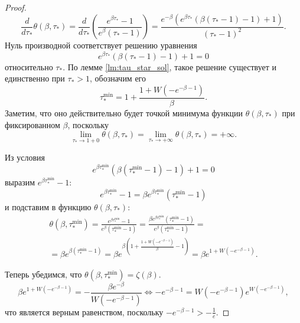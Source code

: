 \begin{proof}
	\begin{equation*}
		\frac{d}{d\tau_*} \theta(\beta, \tau_*) = \frac{d}{d\tau_*} \left( \frac{e^{\beta\tau_*} - 1}{e^{\beta}(\tau_* - 1)} \right) = \frac{e^{-\beta}\left(e^{\beta \tau_*}(\beta(\tau_* - 1) - 1) + 1\right)}{(\tau_* - 1)^2}.
	\end{equation*}
	Нуль производной соответствует решению уравнения
	\begin{equation*}
		e^{\beta \tau_*}(\beta(\tau_* - 1) - 1) + 1 = 0
	\end{equation*}
	относительно $\tau_*$. По лемме \ref{lm:tau_star_sol}, такое решение существует и единственно при $\tau_* > 1$, обозначим его
	\begin{equation*}
		\tau_*^{\min} = 1 + \frac{1 + W(-e^{-\beta - 1})}{\beta}.
	\end{equation*}
	Заметим, что оно действительно будет точкой минимума функции $ \theta(\beta, \tau_*)$ при фиксированном $\beta$, поскольку
	\begin{equation*}
		\lim\limits_{\tau_* \to 1 + 0} \theta(\beta, \tau_*) = \lim\limits_{\tau_* \to +\infty} \theta(\beta, \tau_*) = +\infty. 
	\end{equation*}
	
	Из условия
	\begin{equation*}
		e^{\beta \tau_*^{\min}}(\beta(\tau_*^{\min} - 1) - 1) + 1 = 0
	\end{equation*}
	выразим $e^{\beta \tau_*^{\min}} - 1$:
	\begin{equation*}
		e^{\beta \tau_*^{\min}} - 1 = \beta e^{\beta \tau_*^{\min}} (\tau_*^{\min} - 1)
	\end{equation*}
	и подставим в функцию $\theta(\beta, \tau_*)$:
	\begin{multline}
		\theta(\beta, \tau_*^{\min}) = \frac{e^{\beta\tau_*^{\min}} - 1}{e^{\beta}(\tau_*^{\min} - 1)} = \frac{\beta e^{\beta \tau_*^{\min}} (\tau_*^{\min} - 1)}{e^{\beta}(\tau_*^{\min} - 1)} =\\= \beta e^{\beta (\tau_*^{\min} - 1)} = \beta e^{\beta(1 + \frac{1 + W(-e^{-\beta - 1})}{\beta} - 1)} = \beta e^{1 + W(-e^{-\beta - 1})}. 
	\end{multline}
	
	Теперь убедимся, что $\theta(\beta, \tau_*^{\min}) = \zeta(\beta)$.
	\begin{equation*}
		\beta e^{1 + W(-e^{-\beta - 1})} = -\frac{\beta e^{-\beta}}{W(-e^{-\beta - 1})} \Leftrightarrow -e^{-\beta - 1} = W(-e^{-\beta - 1}) e^{W(-e^{-\beta - 1})},
	\end{equation*}
	что является верным равенством, поскольку $-e^{-\beta - 1} > -\frac{1}{e}$.
\end{proof}


